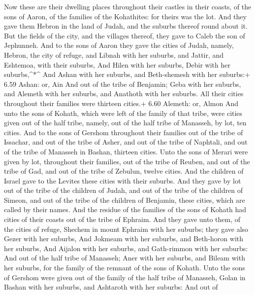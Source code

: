 Now these are their dwelling places throughout their
castles in their coasts, of the sons of Aaron, of the families of the
Kohathites: for theirs was the lot.  And they gave them
Hebron in the land of Judah, and the suburbs thereof round about it.
 But the fields of the city, and the villages thereof, they
gave to Caleb the son of Jephunneh.  And to the sons of
Aaron they gave the cities of Judah, namely, Hebron, the city of refuge,
and Libnah with her suburbs, and Jattir, and Eshtemoa, with their
suburbs,  And Hilen with her suburbs, Debir with her
suburbs,\^{}*\^{}  And Ashan with her suburbs, and
Beth-shemesh with her suburbs:+ 6.59 Ashan: or, Ain  And
out of the tribe of Benjamin; Geba with her suburbs, and Alemeth with
her suburbs, and Anathoth with her suburbs. All their cities throughout
their families were thirteen cities.+ 6.60 Alemeth: or, Almon
 And unto the sons of Kohath, which were left of the family
of that tribe, were cities given out of the half tribe, namely, out of
the half tribe of Manasseh, by lot, ten cities.  And to the
sons of Gershom throughout their families out of the tribe of Issachar,
and out of the tribe of Asher, and out of the tribe of Naphtali, and out
of the tribe of Manasseh in Bashan, thirteen cities.  Unto
the sons of Merari were given by lot, throughout their families, out of
the tribe of Reuben, and out of the tribe of Gad, and out of the tribe
of Zebulun, twelve cities.  And the children of Israel gave
to the Levites these cities with their suburbs.  And they
gave by lot out of the tribe of the children of Judah, and out of the
tribe of the children of Simeon, and out of the tribe of the children of
Benjamin, these cities, which are called by their names. 
And the residue of the families of the sons of Kohath had cities of
their coasts out of the tribe of Ephraim.  And they gave
unto them, of the cities of refuge, Shechem in mount Ephraim with her
suburbs; they gave also Gezer with her suburbs,  And
Jokmeam with her suburbs, and Beth-horon with her suburbs, 
And Aijalon with her suburbs, and Gath-rimmon with her suburbs:
 And out of the half tribe of Manasseh; Aner with her
suburbs, and Bileam with her suburbs, for the family of the remnant of
the sons of Kohath.  Unto the sons of Gershom were given
out of the family of the half tribe of Manasseh, Golan in Bashan with
her suburbs, and Ashtaroth with her suburbs:  And out of
